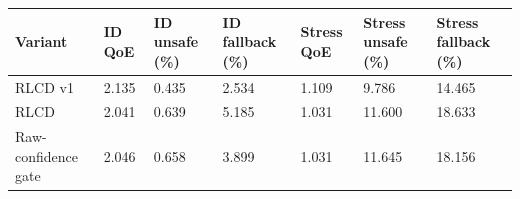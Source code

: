 \begin{tabular}{lllllll}
\toprule
Variant & ID QoE & ID unsafe (\%) & ID fallback (\%) & Stress QoE & Stress unsafe (\%) & Stress fallback (\%) \\
\midrule
RLCD v1 & 2.135 & 0.435 & 2.534 & 1.109 & 9.786 & 14.465 \\
RLCD & 2.041 & 0.639 & 5.185 & 1.031 & 11.600 & 18.633 \\
Raw-confidence gate & 2.046 & 0.658 & 3.899 & 1.031 & 11.645 & 18.156 \\
\bottomrule
\end{tabular}
